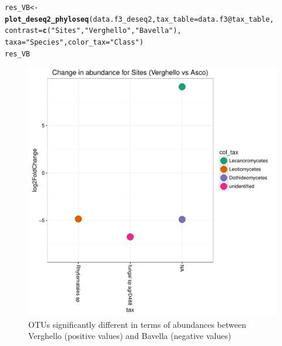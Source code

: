 \documentclass[12pt]{article}\usepackage[]{graphicx}\usepackage[]{color}
\makeatletter
\def\maxwidth{ %
  \ifdim\Gin@nat@width>\linewidth
    \linewidth
  \else
    \Gin@nat@width
  \fi
}
\newcommand{\hlstr}[1]{\textcolor[rgb]{0.192,0.494,0.8}{#1}}%
\newcommand{\hlopt}[1]{\textcolor[rgb]{0,0,0}{#1}}%
\newcommand{\hlstd}[1]{\textcolor[rgb]{0.345,0.345,0.345}{#1}}%
\newcommand{\hlkwb}[1]{\textcolor[rgb]{0.69,0.353,0.396}{#1}}%
\newcommand{\hlkwc}[1]{\textcolor[rgb]{0.333,0.667,0.333}{#1}}%
\newcommand{\hlkwd}[1]{\textcolor[rgb]{0.737,0.353,0.396}{\textbf{#1}}}%
\newenvironment{kframe}{%
 \def\at@end@of@kframe{}%
 \ifinner\ifhmode%
  \def\at@end@of@kframe{\end{minipage}}%
  \begin{minipage}{\columnwidth}%
 \fi\fi%
 \def\FrameCommand##1{\hskip\@totalleftmargin \hskip-\fboxsep
 \colorbox{shadecolor}{##1}\hskip-\fboxsep
     \hskip-\linewidth \hskip-\@totalleftmargin \hskip\columnwidth}%
 \MakeFramed {\advance\hsize-\width
   \@totalleftmargin\z@ \linewidth\hsize
   \@setminipage}}%
 {\par\unskip\endMakeFramed%
 \at@end@of@kframe}
\newenvironment{knitrout}{}{} %
\numberwithin{figure}{section}
\makeatother
\begin{document}
\begin{knitrout}\small
{}\color{fgcolor}\begin{kframe}
\begin{alltt}
\hlstd{res_VB} \hlkwb{<-} \hlkwd{plot_deseq2_phyloseq}\hlstd{(data.f3_deseq2,} \hlkwc{tax_table} \hlstd{= data.f3}\hlopt{@}\hlkwc{tax_table}\hlstd{,}
                               \hlkwc{contrast} \hlstd{=} \hlkwd{c}\hlstd{(}\hlstr{"Sites"}\hlstd{,} \hlstr{"Verghello"}\hlstd{,} \hlstr{"Bavella"}\hlstd{),}
                               \hlkwc{taxa} \hlstd{=} \hlstr{"Species"}\hlstd{,} \hlkwc{color_tax} \hlstd{=} \hlstr{"Class"}\hlstd{)}
\hlstd{res_VB}
\end{alltt}
\end{kframe}\begin{figure}

{\centering \includegraphics[width=\maxwidth]{figure/unnamed-chunk-73-1} 

}

\caption[OTUs significantly different in terms of abundances between Verghello (positive values) and Bavella (negative values)]{OTUs significantly different in terms of abundances between Verghello (positive values) and Bavella (negative values)}\label{fig:unnamed-chunk-73}
\end{figure}


\end{knitrout}
\end{document}
